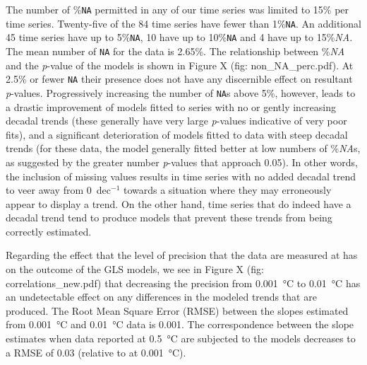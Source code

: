 The number of \%\texttt{NA} permitted in any of our time series was limited to 15\% per time series. Twenty-five of the 84 time series have fewer than 1\%\texttt{NA}. An additional 45 time series have up to 5\%\texttt{NA}, 10 have up to 10\%\texttt{NA} and 4 have up to 15\%\emph{NA}. The mean number of \texttt{NA} for the data is 2.65\%. The relationship between \%\emph{NA} and the \emph{p}-value of the models is shown in Figure X (fig: non_NA_perc.pdf). At 2.5\% or fewer \texttt{NA} their presence does not have any discernible effect on resultant \emph{p}-values. Progressively increasing the number of \texttt{NA}s above 5\%, however, leads to a drastic improvement of models fitted to series with no or gently increasing decadal trends (these generally have very large \emph{p}-values indicative of very poor fits), and a significant deterioration of models fitted to data with steep decadal trends (for these data, the model generally fitted better at low numbers of \%\emph{NA}s, as suggested by the greater number \emph{p}-values that approach 0.05). In other words, the inclusion of missing values results in time series with no added decadal trend to veer away from \si{0}{\degreeCelsius}~dec$^{-1}$ towards a situation where they may erroneously appear to display a trend. On the other hand, time series that do indeed have a decadal trend tend to produce models that prevent these trends from being correctly estimated.

Regarding the effect that the level of precision that the data are measured at has on the outcome of the GLS models, we see in Figure X (fig: correlations_new.pdf) that decreasing the precision from \SI{0.001}{\degreeCelsius} to \SI{0.01}{\degreeCelsius} has an undetectable effect on any differences in the modeled trends that are produced. The Root Mean Square Error (RMSE) between the slopes estimated from \SI{0.001}{\degreeCelsius} and \SI{0.01}{\degreeCelsius} data is 0.001. The correspondence between the slope estimates when data reported at \SI{0.5}{\degreeCelsius} are subjected to the models decreases to a RMSE of 0.03 (relative to at \SI{0.001}{\degreeCelsius}).


